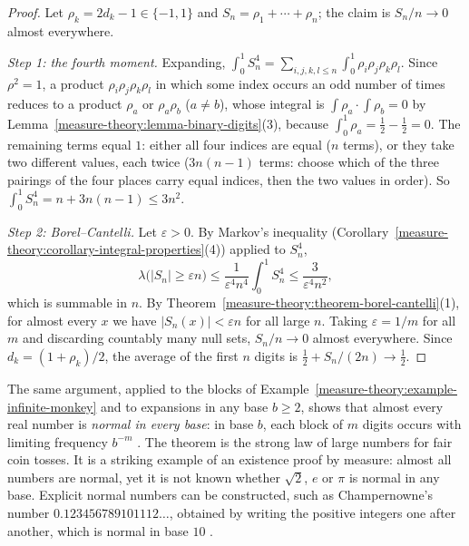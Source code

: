 \begin{proof}
Let $\rho_k = 2d_k - 1 \in \{-1, 1\}$ and $S_n = \rho_1 + \cdots + \rho_n$; the claim is $S_n/n \to 0$ almost everywhere.

\emph{Step 1: the fourth moment.} Expanding,
$\int_0^1S_n^4 = \sum_{i, j, k, l \leq n}\int_0^1\rho_i\rho_j\rho_k\rho_l$. Since $\rho^2 = 1$, a product $\rho_i\rho_j\rho_k\rho_l$ in which some index occurs an odd number of times reduces to a product
$\rho_a$ or $\rho_a\rho_b$ ($a \neq b$), whose integral is $\int\rho_a \cdot \int\rho_b = 0$ by Lemma~\ref{measure-theory:lemma-binary-digits}(3), because $\int_0^1\rho_a = \frac12 - \frac12 = 0$. The
remaining terms equal $1$: either all four indices are equal ($n$ terms), or they take two different values, each twice ($3n(n - 1)$ terms: choose which of the three pairings of the four places carry equal
indices, then the two values in order). So $\int_0^1S_n^4 = n + 3n(n - 1) \leq 3n^2$.

\emph{Step 2: Borel--Cantelli.} Let $\varepsilon > 0$. By Markov's inequality (Corollary~\ref{measure-theory:corollary-integral-properties}(4)) applied to $S_n^4$,
\[
\lambda\bigl(|S_n| \geq \varepsilon n\bigr) \leq \frac{1}{\varepsilon^4n^4}\int_0^1S_n^4 \leq \frac{3}{\varepsilon^4n^2},
\]
which is summable in $n$. By Theorem~\ref{measure-theory:theorem-borel-cantelli}(1), for almost every $x$ we have $|S_n(x)| < \varepsilon n$ for all large $n$. Taking $\varepsilon = 1/m$ for all $m$ and
discarding countably many null sets, $S_n/n \to 0$ almost everywhere. Since $d_k = (1 + \rho_k)/2$, the average of the first $n$ digits is $\frac12 + S_n/(2n) \to \frac12$.
\end{proof}

\begin{remark}\label{measure-theory:remark-normal-numbers}
The same argument, applied to the blocks of Example~\ref{measure-theory:example-infinite-monkey} and to expansions in any base $b \geq 2$, shows that almost every real number is \emph{normal in every base}:
in base $b$, each block of $m$ digits occurs with limiting frequency $b^{-m}$ \cite{borel-1909}. The theorem is the strong law of large numbers for fair coin tosses. It is a striking example of an
existence proof by measure: almost all numbers are normal, yet it is not known whether $\sqrt2$, $e$ or $\pi$ is normal in any base. Explicit normal numbers can be constructed, such as Champernowne's
number $0.123456789101112\ldots$, obtained by writing the positive integers one after another, which is normal in base $10$ \cite{champernowne-1933}.
\end{remark}

